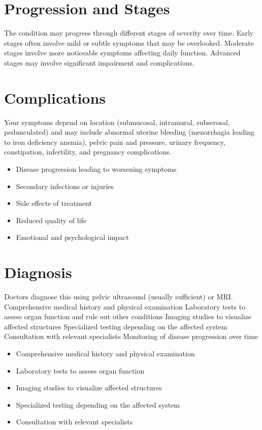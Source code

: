 \section{Progression and Stages}
The condition may progress through different stages of severity over time. Early stages often involve mild or subtle symptoms that may be overlooked. Moderate stages involve more noticeable symptoms affecting daily function. Advanced stages may involve significant impairment and complications.
\section{Complications}
Your symptoms depend on location (submucosal, intramural, subserosal, pedunculated) and may include abnormal uterine bleeding (menorrhagia leading to iron deficiency anemia), pelvic pain and pressure, urinary frequency, constipation, infertility, and pregnancy complications.

\begin{itemize}[noitemsep]
  \item Disease progression leading to worsening symptoms
  \item Secondary infections or injuries
  \item Side effects of treatment
  \item Reduced quality of life
  \item Emotional and psychological impact
\end{itemize}
\section{Diagnosis}
Doctors diagnose this using pelvic ultrasound (usually sufficient) or MRI. Comprehensive medical history and physical examination Laboratory tests to assess organ function and rule out other conditions Imaging studies to visualize affected structures Specialized testing depending on the affected system Consultation with relevant specialists Monitoring of disease progression over time

\begin{itemize}[noitemsep]
  \item Comprehensive medical history and physical examination
  \item Laboratory tests to assess organ function
  \item Imaging studies to visualize affected structures
  \item Specialized testing depending on the affected system
  \item Consultation with relevant specialists
\end{itemize}
